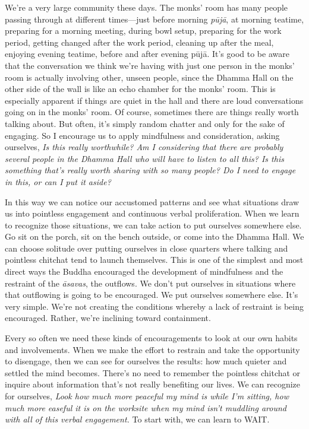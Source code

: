 We're a very large community these days. The monks' room has many 
people passing through at different times---just before morning 
\emph{pūjā}, at morning teatime, preparing for a morning meeting, 
during bowl setup, preparing for the work period, getting changed after 
the work period, cleaning up after the meal, enjoying evening teatime, 
before and after evening pūjā. It's good to be aware that the 
conversation we think we're having with just one person in the monks' 
room is actually involving other, unseen people, since the Dhamma Hall 
on the other side of the wall is like an echo chamber for the monks' 
room. This is especially apparent if things are quiet in the hall and 
there are loud conversations going on in the monks' room. Of course, 
sometimes there are things really worth talking about. But often, it's 
simply random chatter and only for the sake of engaging. So I encourage 
us to apply mindfulness and consideration, asking ourselves, \emph{Is 
this really worthwhile? Am I considering that there are probably 
several people in the Dhamma Hall who will have to listen to all this? 
Is this something that's really worth sharing with so many people? Do I 
need to engage in this, or can I put it aside?}

In this way we can notice our accustomed patterns and see what
situations draw us into pointless engagement and continuous verbal
proliferation. When we learn to recognize those situations, we can take
action to put ourselves somewhere else. Go sit on the porch, sit on the
bench outside, or come into the Dhamma Hall. We can choose solitude over
putting ourselves in close quarters where talking and pointless chitchat
tend to launch themselves. This is one of the simplest and most direct
ways the Buddha encouraged the development of mindfulness and the
restraint of the \emph{āsavas}, the outflows. We don't put
\mbox{ourselves} in situations where that outflowing is going to be
encouraged. We put ourselves somewhere else. It's very simple. We're not
creating the conditions whereby a lack of restraint is being encouraged.
Rather, we're inclining toward containment.

Every so often we need these kinds of encouragements to look at our own 
habits and involvements. When we make the effort to restrain and take 
the opportunity to disengage, then we can see for ourselves the 
results: how much quieter and settled the mind becomes. There's no need 
to remember the pointless chitchat or inquire about information that's 
not really benefiting our lives. We can recognize for ourselves, 
\emph{Look how much more peaceful my mind is while I'm sitting, how 
much more easeful it is on the worksite when my mind isn't muddling 
around with all of this verbal engagement.} To start with, we can learn 
to WAIT.

